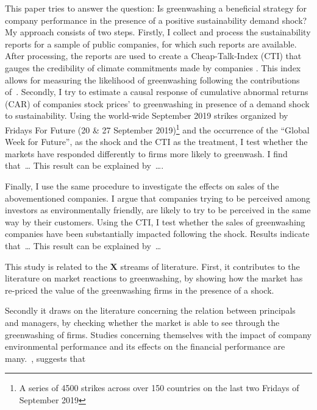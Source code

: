 \documentclass[12pt]{article}
\begin{document}
This paper tries to answer the question: Is greenwashing a beneficial strategy for company performance in the presence of a positive sustainability demand shock? My approach consists of two steps. Firstly, I collect and process the sustainability reports for a sample of public companies, for which such reports are available. After processing, the reports are used to create a Cheap-Talk-Index (CTI) that gauges the credibility of climate commitments made by companies \parencite{bingler_how_2024}. This index allows for measuring the likelihood of greenwashing following the contributions of~\cite{coen_are_2022}. Secondly, I try to estimate a causal response of cumulative abnormal returns (CAR) of companies stock prices' to greenwashing in presence of a demand shock to sustainability. Using the world-wide September 2019 strikes organized by Fridays For Future (20 \& 27 September 2019)\footnote{A series of 4500 strikes across over 150 countries on the last two Fridays of September 2019} and the occurrence of the ``Global Week for Future'', as the shock and the CTI as the treatment, I test whether the markets have responded differently to firms more likely to greenwash. I find that\ \dots
This result can be explained by\ \dots.

Finally, I use the same procedure to investigate the effects on sales of the abovementioned companies. I argue that companies trying to be perceived among investors as environmentally friendly, are likely to try to be perceived in the same way by their customers. Using the CTI, I test whether the sales of greenwashing companies have been substantially impacted following the shock. Results indicate that\ \dots 
This result can be explained by\ \dots 
 

This study is related to the \textbf{X} streams of literature. First, it contributes to the literature on market reactions to greenwashing, by showing how the market has re-priced the value of the greenwashing firms in the presence of a shock.  

Secondly it draws on the literature concerning the relation between principals and managers, by checking whether the market is able to see through the greenwashing of firms. Studies concerning themselves with the impact of company environmental performance and its effects on the financial performance are many.~\cite{ilhan_climate_2023}, suggests that 
\end{document}
